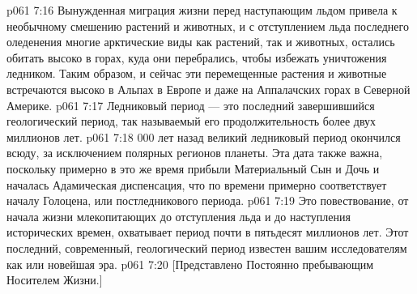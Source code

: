 \vs p061 7:16 Вынужденная миграция жизни перед наступающим льдом привела к необычному смешению растений и животных, и с отступлением льда последнего оледенения многие арктические виды как растений, так и животных, остались обитать высоко в горах, куда они перебрались, чтобы избежать уничтожения ледником. Таким образом, и сейчас эти перемещенные растения и животные встречаются высоко в Альпах в Европе и даже на Аппалачских горах в Северной Америке.
\vs p061 7:17 \pc Ледниковый период --- это последний завершившийся геологический период, так называемый  его продолжительность более двух миллионов лет.
\vs p061 7:18  000 лет назад великий ледниковый период окончился всюду, за исключением полярных регионов планеты. Эта дата также важна, поскольку примерно в это же время прибыли Материальный Сын и Дочь и началась Адамическая диспенсация, что по времени примерно соответствует началу Голоцена, или постледникового периода.
\vs p061 7:19 \pc Это повествование, от начала жизни млекопитающих до отступления льда и до наступления исторических времен, охватывает период почти в пятьдесят миллионов лет. Этот последний, современный, геологический период известен вашим исследователям как  или новейшая эра.
\vsetoff
\vs p061 7:20 [Представлено Постоянно пребывающим Носителем Жизни.]
